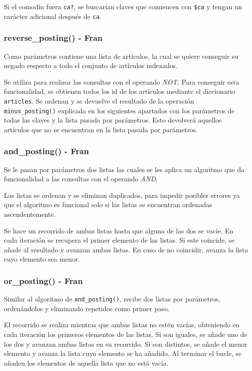 \documentclass[12pt,a4paper]{article}
\begin{document}
Si el comodín fuera \texttt{ca?}, se buscarían claves que comiencen con \texttt{\$ca} y tengan un carácter adicional después de \texttt{ca}.


\subsubsection{reverse\_posting() - Fran}
Como parámetros contiene una lista de artículos, la cual se quiere conseguir su negado respecto a todo el conjunto de artículos indexados.

Se utiliza para realizar las consultas con el operando \textit{NOT}. Para conseguir esta funcionalidad, se obtienen todos los id de los artículos mediante el diccionario \texttt{articles}. Se ordenan y se devuelve el resultado de la operación \texttt{minus\_posting()} explicada en los siguientes apartados con los parámetros de todas las claves y la lista pasada por parámetros. Esto devolverá aquellos artículos que no se encuentran en la lista pasada por parámetros.

\subsubsection{and\_posting() - Fran}
Se le pasan por parámetros dos listas las cuales se les aplica un algoritmo que da funcionalidad a las consultas con el operando \textit{AND}.

Las listas se ordenan y se eliminan duplicados, para impedir posibles errores ya que el algoritmo es funcional solo si las listas se encuentran ordenadas ascendentemente.

Se hace un recorrido de ambas listas hasta que alguna de las dos se vacíe. En cada iteración se recupera el primer elemento de las listas. Si este coincide, se añade al resultado y avanzan ambas listas. En caso de no coincidir, avanza la lista cuyo elemento sea menor.

\subsubsection{or\_posting() - Fran}
Similar al algoritmo de \texttt{and\_posting()}, recibe dos listas por parámetros, ordenándolos y eliminando repetidos como primer paso.

El recorrido se realiza mientras que ambas listas no estén vacías, obteniendo en cada iteración los primeros elementos de las listas. Si son iguales, se añade uno de los dos y avanzan ambas listas en su recorrido. Si son distintos, se añade el menor elemento y avanza la lista cuyo elemento se ha añadido. Al terminar el bucle, se añaden los elementos de aquella lista que no está vacía.
\end{document}
